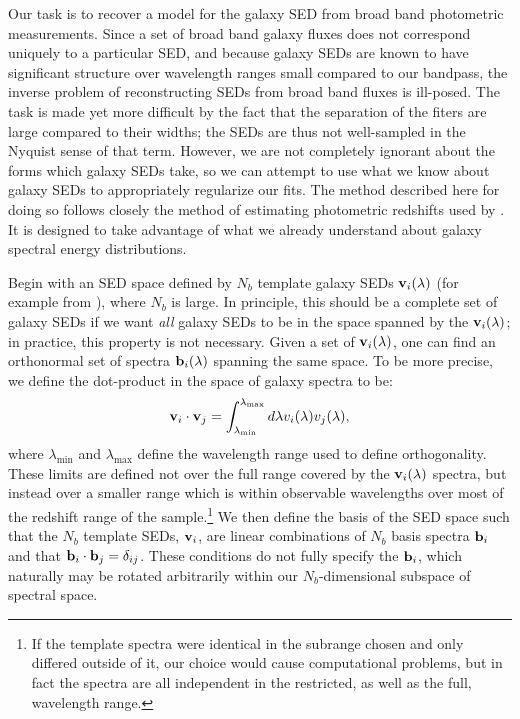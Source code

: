 \documentclass[10pt,preprint]{aastex}
\newcommand{\vv}[1]{{\bf #1}}
\begin{document}
Our task is to recover a model for the galaxy SED from broad band
photometric measurements. Since a set of broad band galaxy fluxes does
not correspond uniquely to a particular SED, and because galaxy SEDs
are known to have significant structure over wavelength ranges small
compared to our bandpass, the inverse problem of reconstructing SEDs
from broad band fluxes is ill-posed. The task is made yet more
difficult by the fact that the separation of the fiters are large
compared to their widths; the SEDs are thus not well-sampled in the
Nyquist sense of that term. However, we are not completely ignorant
about the forms which galaxy SEDs take, so we can attempt to use what
we know about galaxy SEDs to appropriately regularize our fits.  The
method described here for doing so follows closely the method of
estimating photometric redshifts used by \citet{csabai00a}.  It is
designed to take advantage of what we already understand about galaxy
spectral energy distributions.

Begin with an SED space defined by $N_b$ template galaxy SEDs
$\vv{v}_i(\lambda)$ (for example from \citealt{bruzual93a}), where $N_b$ is
large. In principle, this should be a complete set of galaxy SEDs if
we want {\it all} galaxy SEDs to be in the space spanned by the
$\vv{v}_i(\lambda)$; in practice, this property is not necessary.
Given a set of $\vv{v}_i(\lambda)$, one can find an orthonormal set of
spectra $\vv{b}_i(\lambda)$ spanning the same space.  To be more
precise, we define the dot-product in the space of galaxy spectra to
be:
\begin{equation}
\vv{v}_i \cdot \vv{v}_j =
\int_{\lambda_{\mathrm{min}}}^{\lambda_{\mathrm{max}}} d\lambda
v_i(\lambda) v_j(\lambda),
\end{equation}
where $\lambda_{\mathrm{min}}$ and $\lambda_{\mathrm{max}}$ define the
wavelength range used to define orthogonality. These limits are
defined not over the full range covered by the $\vv{v}_i(\lambda)$
spectra, but instead over a smaller range which is within observable
wavelengths over most of the redshift range of the sample.\footnote{
If the template spectra were identical in the subrange chosen and only
differed outside of it, our choice would cause computational problems,
but in fact the spectra are all independent in the restricted, as well
as the full, wavelength range.}  We then define the basis of the SED
space such that the $N_b$ template SEDs, $\vv{v}_i$, are linear
combinations of $N_b$ basis spectra $\vv{b}_i$ and that $\vv{b}_i
\cdot \vv{b}_j = \delta_{ij}$. These conditions do not fully specify
the $\vv{b}_i$, which naturally may be rotated arbitrarily within our
$N_b$-dimensional subspace of spectral space.
\end{document}
